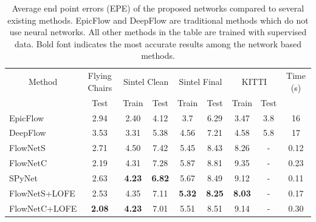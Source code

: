 \documentclass[10pt,twocolumn,letterpaper]{article}
\begin{document}
\begin{table}[]
\centering
\caption{Average end point errors (EPE) of the proposed networks compared to several existing methods. EpicFlow and DeepFlow are traditional methods which do not use neural networks. All other methods in the table are trained with supervised data. Bold font indicates the most accurate results among the network based methods.}
\label{tab: results supervised}
\begin{tabular}{lcccccccc}
\hline
\hline
\multicolumn{1}{c}{Method} & Flying Chairs & \multicolumn{2}{c}{Sintel Clean} & \multicolumn{2}{c}{Sintel Final} & \multicolumn{2}{c}{KITTI} & Time (s) \\
                           & Test          & Train           & Test           & Train           & Test           & Train            & Test   &          \\ \hline
EpicFlow                   & 2.94          & 2.40            & 4.12           & 3.7             & 6.29           & 3.47             & 3.8    & 16       \\
DeepFlow                   & 3.53          & 3.31            & 5.38           & 4.56            & 7.21           & 4.58             & 5.8    & 17       \\ \hline
FlowNetS                   & 2.71          & 4.50            & 7.42           & 5.45            & 8.43           & 8.26             & -      & 0.12     \\
FlowNetC                   & 2.19          & 4.31            & 7.28           & 5.87            & 8.81           & 9.35             & -      & 0.23     \\
SPyNet                     & 2.63          & \textbf{4.23}   & \textbf{6.82}           & 5.67            & 8.49           & 9.12             & -      & 0.11     \\
FlowNetS+LOFE              & 2.53          & 4.35            & 7.11           & \textbf{5.32}   & \textbf{8.25}  & \textbf{8.03}    & -      & 0.17     \\
FlowNetC+LOFE              & \textbf{2.08} & \textbf{4.23}            & 7.01  & 5.51            & 8.51           & 9.14             & -      & 0.30     \\ \hline
\end{tabular}
\end{table}
\end{document}
